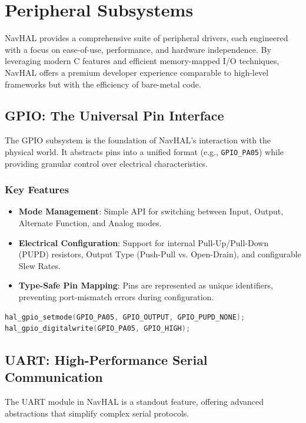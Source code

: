 \section{Peripheral Subsystems}
\label{sec:peripherals}

NavHAL provides a comprehensive suite of peripheral drivers, each engineered with a focus on ease-of-use, performance, and hardware independence. By leveraging modern C features and efficient memory-mapped I/O techniques, NavHAL offers a premium developer experience comparable to high-level frameworks but with the efficiency of bare-metal code.

\subsection{GPIO: The Universal Pin Interface}
The GPIO subsystem is the foundation of NavHAL's interaction with the physical world. It abstracts pins into a unified format (e.g., \texttt{GPIO\_PA05}) while providing granular control over electrical characteristics.

\subsubsection{Key Features}
\begin{itemize}
    \item \textbf{Mode Management}: Simple API for switching between Input, Output, Alternate Function, and Analog modes.
    \item \textbf{Electrical Configuration}: Support for internal Pull-Up/Pull-Down (PUPD) resistors, Output Type (Push-Pull vs. Open-Drain), and configurable Slew Rates.
    \item \textbf{Type-Safe Pin Mapping}: Pins are represented as unique identifiers, preventing port-mismatch errors during configuration.
\end{itemize}

\begin{lstlisting}[language=C, caption=GPIO Initialization and Control]
hal_gpio_setmode(GPIO_PA05, GPIO_OUTPUT, GPIO_PUPD_NONE);
hal_gpio_digitalwrite(GPIO_PA05, GPIO_HIGH);
\end{lstlisting}

\subsection{UART: High-Performance Serial Communication}
The UART module in NavHAL is a standout feature, offering advanced abstractions that simplify complex serial protocols.

